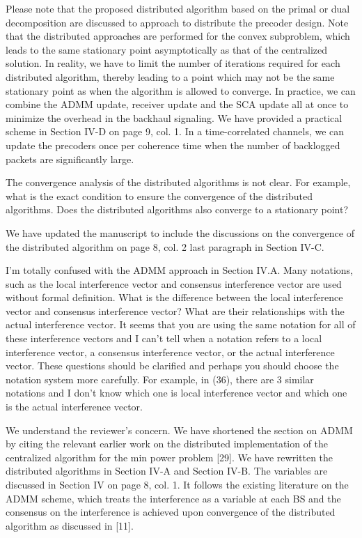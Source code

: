 \begin{itemize}
\resp Please note that the proposed distributed algorithm based on the primal or dual decomposition are discussed to approach to distribute the precoder design. Note that the distributed approaches are performed for the convex subproblem, which leads to the same stationary point asymptotically as that of the centralized solution. In reality, we have to limit the number of iterations required for each distributed algorithm, thereby leading to a point which may not be the same stationary point as when the algorithm is allowed to converge. In practice, we can combine the ADMM update, receiver update and the SCA update all at once to minimize the overhead in the backhaul signaling. We have provided a practical scheme in Section IV-D on page 9, col. 1. In a time-correlated channels, we can update the precoders once per coherence time when the number of backlogged packets are significantly large.

 The convergence analysis of the distributed algorithms is not clear. For example, what is the exact condition to ensure the convergence of the distributed algorithms. Does the distributed algorithms also converge to a stationary point?

\resp We have updated the manuscript to include the discussions on the convergence of the distributed algorithm on page 8, col. 2 last paragraph in Section IV-C.

 I’m totally confused with the ADMM approach in Section IV.A. Many notations, such as the local interference vector and consensus interference vector are used without formal definition. What is the difference between the local interference vector and consensus interference vector? What are their relationships with the actual interference vector. It seems that you are using the same notation for all of these interference vectors and I can’t tell when a notation refers to a local interference vector, a consensus interference vector, or the actual interference vector. These questions should be clarified and perhaps you should choose the notation system more carefully. For example, in (36), there are 3 similar notations and I don’t know which one is local interference vector and which one is the actual interference vector.

\resp We understand the reviewer's concern. We have shortened the section on ADMM by citing the relevant earlier work on the distributed implementation of the centralized algorithm for the min power problem [29]. We have rewritten the distributed algorithms in Section IV-A and Section IV-B. The variables are discussed in Section IV on page 8, col. 1. It follows the existing literature on the ADMM scheme, which treats the interference as a variable at each BS and the consensus on the interference is achieved upon convergence of the distributed algorithm as discussed in [11].


\end{itemize}
